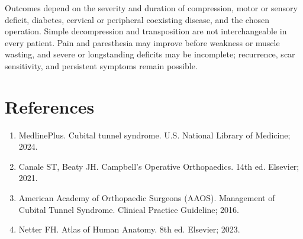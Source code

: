 Outcomes depend on the severity and duration of compression, motor or sensory deficit, diabetes, cervical or peripheral coexisting disease, and the chosen operation. Simple decompression and transposition are not interchangeable in every patient. Pain and paresthesia may improve before weakness or muscle wasting, and severe or longstanding deficits may be incomplete; recurrence, scar sensitivity, and persistent symptoms remain possible.

\section*{References}
\begin{enumerate}
  \item MedlinePlus. Cubital tunnel syndrome. U.S. National Library of Medicine; 2024.
  \item Canale ST, Beaty JH. Campbell's Operative Orthopaedics. 14th ed. Elsevier; 2021.
  \item American Academy of Orthopaedic Surgeons (AAOS). Management of Cubital Tunnel Syndrome. Clinical Practice Guideline; 2016.
  \item Netter FH. Atlas of Human Anatomy. 8th ed. Elsevier; 2023.
\end{enumerate}

\clearpage
